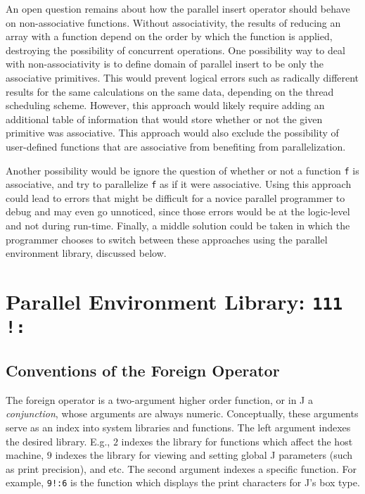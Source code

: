 An open question remains about how the parallel insert operator should behave on non-associative functions. 
Without associativity, the results of reducing an array with a function depend on the order by which the function is applied, 
destroying the possibility of concurrent operations.
One possibility way to deal with non-associativity is to define domain of parallel insert to be only the associative primitives. 
This would prevent logical errors such as radically different results for the same calculations on the same data, 
depending on the thread scheduling scheme. 
However, this approach would likely require adding an additional table of information 
that would store whether or not the given primitive was associative.
This approach would also exclude the possibility of 
user-defined functions that are associative from benefiting from parallelization. 

Another possibility would be ignore the question of whether or not a function \texttt{f} is associative, 
and try to parallelize \texttt{f} as if it were associative.
Using this approach could lead to errors that might be difficult for a novice parallel programmer to debug and may even go unnoticed, 
since those errors would be at the logic-level and not during run-time.
Finally, a middle solution could be taken in which the programmer chooses to switch between these approaches using the parallel environment library, 
discussed below.

\section{Parallel Environment Library: \texttt{111 !:}} 
\label{pfor}

\subsection{Conventions of the Foreign Operator}
The foreign operator is a two-argument higher order function, or in J a \textit{conjunction}, 
whose arguments are always numeric.
Conceptually, these arguments serve as an index into system libraries and functions.
The left argument indexes the desired library.
E.g., $2$ indexes the library for functions which affect the host machine, 
$9$ indexes the library for viewing and setting global J parameters (such as print precision), and etc.
The second argument indexes a specific function.
For example, \texttt{9!:6}  is the function which displays the print characters for J's box type.

